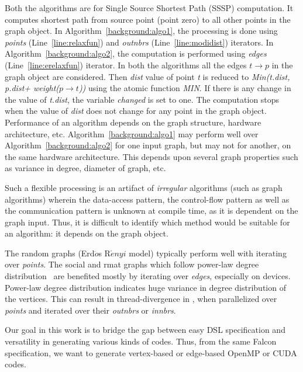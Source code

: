 \par
Both the algorithms are for  Single Source Shortest Path (SSSP) computation. It computes shortest path from source point (point zero) to all other points in the graph object. 
 In Algorithm~\ref{background:algo1}, the processing is done using {\it points} (Line~\ref{line:relaxfun}) and {\it outnbrs} (Line~\ref{line:modidist}) iterators. In Algorithm~\ref{background:algo2}, the computation is performed using {\it edges} (Line~\ref{line:erelaxfun}) iterator.
 In both the algorithms all the edges $t\rightarrow p$ in the graph object are considered. Then {\it dist} value of point {\it t} is reduced to {\it Min(t.dist, p.dist+ weight($p\rightarrow t$))} using the atomic function {\it MIN}. If there is any change in the value of {\it t.dist}, the variable {\it changed} is set to one. The computation stops when the value of {\it dist} does not change for any point in the graph object. Performance of an algorithm depends on the graph structure, hardware architecture, etc.
 Algorithm~\ref{background:algo1} may perform well over Algorithm~\ref{background:algo2} for one input graph, but may not for another,  on the same hardware architecture. This depends upon several graph properties such as variance in degree, diameter of graph, etc.

Such a flexible processing is an artifact of \textit{irregular} algorithms (such as graph algorithms) wherein the data-access pattern, the control-flow pattern as well as the communication pattern is unknown at compile time, as it is dependent on the graph input.
 Thus, it is difficult to identify which method would be suitable for an algorithm:  it depends on the graph object.

The random graphs (Erd$\ddot{o}$s R$\acute{e}nyi$ model) typically perform well with iterating over {\it points}. The social and rmat graphs which follow power-law degree distribution~\cite{Gharaibeh:2012:YOT:2370816.2370866} are benefited mostly by iterating over {\it edges}, especially on \GPU devices.  Power-law degree distribution indicates huge variance in degree distribution of the vertices. This can result in thread-divergence in \GPU, when parallelized over {\it points} and iterated over their {\it outnbrs} or {\it innbrs}.  

Our goal in this work is to bridge the gap between easy DSL specification and versatility in generating various kinds of codes.
Thus, from the same Falcon specification, we want to generate vertex-based or edge-based OpenMP or CUDA codes.



